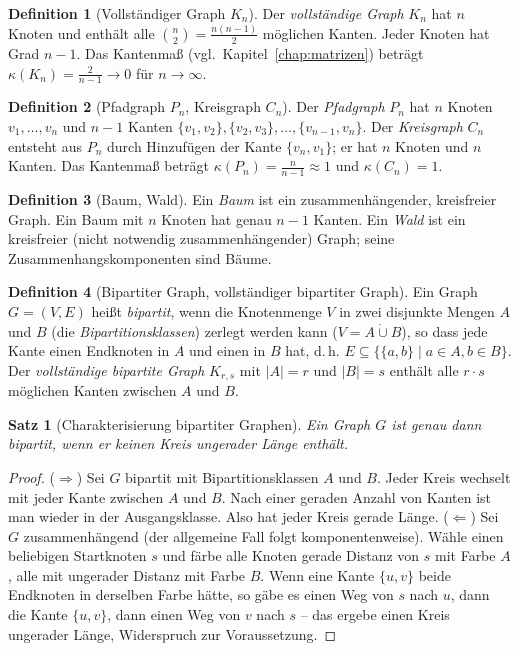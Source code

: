 ﻿\documentclass[a4paper,12pt,openany,oneside]{book}
\theoremstyle{definition}
\newtheorem{definition}{Definition}[chapter]
\theoremstyle{plain}
\newtheorem{satz}{Satz}[chapter]
\theoremstyle{remark}
\begin{document}
\begin{definition}[Vollst\"andiger Graph $K_n$]
  Der \emph{vollst\"andige Graph} $K_n$ hat $n$ Knoten und enth\"alt alle
  $\binom{n}{2} = \frac{n(n-1)}{2}$ m\"oglichen Kanten. Jeder Knoten hat
  Grad $n-1$. Das Kantenma\ss{} (vgl.~Kapitel~\ref{chap:matrizen}) betr\"agt
  $\kappa(K_n) = \frac{2}{n-1} \to 0$ f\"ur $n \to \infty$.
\end{definition}

\begin{definition}[Pfadgraph $P_n$, Kreisgraph $C_n$]
  Der \emph{Pfadgraph} $P_n$ hat $n$ Knoten $v_1, \ldots, v_n$ und $n-1$
  Kanten $\{v_1,v_2\}, \{v_2,v_3\}, \ldots, \{v_{n-1},v_n\}$.
  Der \emph{Kreisgraph} $C_n$ entsteht aus $P_n$ durch Hinzuf\"ugen der
  Kante $\{v_n, v_1\}$; er hat $n$ Knoten und $n$ Kanten.
  Das Kantenma\ss{} betr\"agt $\kappa(P_n) = \frac{n}{n-1} \approx 1$ und
  $\kappa(C_n) = 1$.
\end{definition}

\begin{definition}[Baum, Wald]
  Ein \emph{Baum} ist ein zusammenh\"angender, kreisfreier Graph. Ein Baum
  mit $n$ Knoten hat genau $n-1$ Kanten. Ein \emph{Wald} ist ein kreisfreier
  (nicht notwendig zusammenh\"angender) Graph; seine Zusammenhangskomponenten
  sind B\"aume.
\end{definition}

\begin{definition}[Bipartiter Graph, vollst\"andiger bipartiter Graph]
  Ein Graph $G = (V,E)$ hei\ss{}t \emph{bipartit}, wenn die Knotenmenge $V$
  in zwei disjunkte Mengen $A$ und $B$ (die \emph{Bipartitionsklassen})
  zerlegt werden kann ($V = A \mathbin{\dot{\cup}} B$), so dass jede Kante
  einen Endknoten in $A$ und einen in $B$ hat, d.\,h.
  $E \subseteq \{\{a,b\} \mid a \in A, b \in B\}$.
  Der \emph{vollst\"andige bipartite Graph} $K_{r,s}$ mit $|A| = r$ und
  $|B| = s$ enth\"alt alle $r \cdot s$ m\"oglichen Kanten zwischen $A$ und $B$.
\end{definition}

\begin{satz}[Charakterisierung bipartiter Graphen]
  Ein Graph $G$ ist genau dann bipartit, wenn er keinen Kreis ungerader
  L\"ange enth\"alt.
\end{satz}

\begin{proof}
  ($\Rightarrow$) Sei $G$ bipartit mit Bipartitionsklassen $A$ und $B$.
  Jeder Kreis wechselt mit jeder Kante zwischen $A$ und $B$. Nach einer
  geraden Anzahl von Kanten ist man wieder in der Ausgangsklasse. Also hat
  jeder Kreis gerade L\"ange.
  ($\Leftarrow$) Sei $G$ zusammenh\"angend (der allgemeine Fall folgt
  komponentenweise). W\"ahle einen beliebigen Startknoten $s$ und f\"arbe
  alle Knoten gerade Distanz von $s$ mit Farbe $A$, alle mit ungerader
  Distanz mit Farbe $B$. Wenn eine Kante $\{u,v\}$ beide Endknoten in
  derselben Farbe h\"atte, so g\"abe es einen Weg von $s$ nach $u$, dann
  die Kante $\{u,v\}$, dann einen Weg von $v$ nach $s$ -- das ergebe einen
  Kreis ungerader L\"ange, Widerspruch zur Voraussetzung.
\end{proof}
\end{document}
